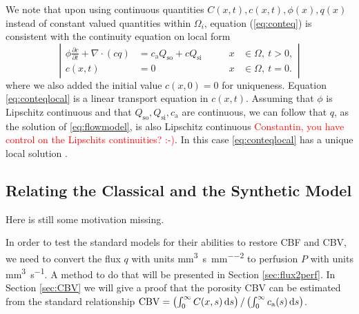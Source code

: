 \documentclass[paper=a4, fontsize=11pt,parskip=half,headings=small]{scrartcl}
\newcommand{\Qso}{Q_{\mathrm{so}}}
\newcommand{\Qsi}{Q_{\mathrm{si}}}
\newcommand{\ca}{c_\mathrm{a}}
\newcommand{\CBV}{\mathrm{CBV}}
\newcommand{\siq}{\milli\meter\cubed\per\second\per\milli\meter\squared}
\newcommand{\siP}{\milli\meter\cubed\per\second}
\begin{document}
	We note that upon using continuous quantities $C(x,t),c(x,t),\phi(x),q(x)$ instead of constant valued quantities within $\Omega_i$, equation (\ref{eq:conteq}) is consistent with the continuity equation on local form
	\begin{equation}
		\left\vert
		\begin{alignedat}{2}
			\phi \frac{\partial c}{\partial t} + \nabla \cdot (cq) &= \ca\Qso + c\Qsi \qquad	&x &\in \Omega, \ t>0,  \\
			c(x,t) &= 0 																			 	&x &\in \Omega, \ t=0.
		\end{alignedat}
		\right\vert
		\label{eq:conteqlocal}
	\end{equation}
	where we also added the initial value $c(x,0) = 0$ for uniqueness.
	Equation \eqref{eq:conteqlocal} is a linear transport equation in $c(x,t)$. 
	Assuming that $\phi$ is Lipschitz continuous and that $\Qso,\Qsi,\ca$ are continuous, we can follow that $q$, as the solution of \eqref{eq:flowmodel}, is also Lipschitz continuous \textcolor{red}{Constantin, you have control on the Lipschits continuities? :-)}.
	In this case \eqref{eq:conteqlocal} has a unique local solution \cite{evans98}.
	


	\subsection{Relating the Classical and the Synthetic Model}\label{sec:relation}
	Here is still some motivation missing.
	
	In order to test the standard models for their abilities to restore CBF and CBV, we need to convert the flux $q$ with units \si{\siq} to perfusion $P$ with units \si{\siP}. 
	A method to do that will be presented in Section \ref{sec:flux2perf}.
	In Section \ref{sec:CBV} we will give a proof that the porosity CBV can be estimated from the standard relationship $\CBV = \left(\int_0^\infty C(x,s) \diffint s\right)/\left(\int_0^\infty \ca(s) \diffint s\right)$.
	
	
	
\end{document}
